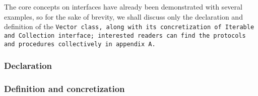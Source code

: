 \def\Subsubsection#1{\subsubsection{#1}
}

The core concepts on interfaces have already been demonstrated with several
examples, so for the sake of brevity, we shall discuss only the declaration
and definition of the \tt{Vector} class, along with its concretization
of \tt{Iterable} and \tt{Collection} interface; interested readers
can find the protocols and procedures collectively in appendix A.

\Subsubsection{Declaration}

\enlargethispage*{\baselineskip}
\enlargethispage*{\baselineskip}
\enlargethispage*{\baselineskip}
\enlargethispage*{\baselineskip}

\Subsubsection{Definition and concretization}
